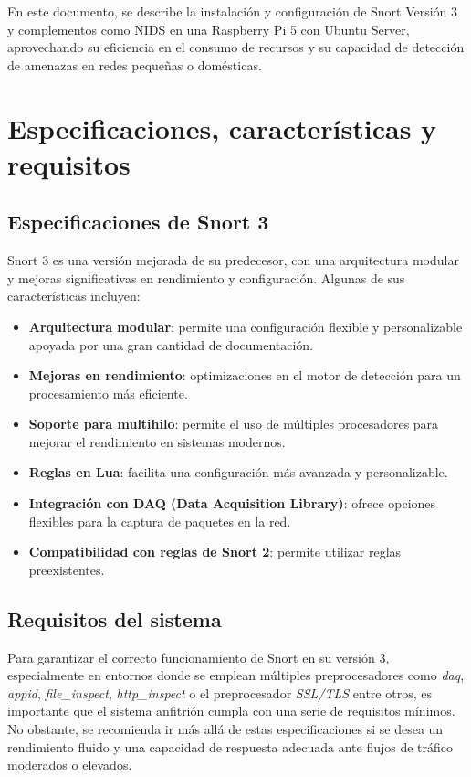 \documentclass[12pt,a4paper]{report}
\begin{document}
En este documento, se describe la instalación y configuración de Snort Versión 3 y complementos como NIDS en una Raspberry Pi 5 con Ubuntu Server, aprovechando su eficiencia en el consumo de recursos y su capacidad de detección de amenazas en redes pequeñas o domésticas.

\section{Especificaciones, características y requisitos}

\subsection{Especificaciones de Snort 3}

Snort 3 es una versión mejorada de su predecesor, con una arquitectura modular y mejoras significativas en rendimiento y configuración. Algunas de sus características incluyen:

\begin{itemize}
\item \textbf{Arquitectura modular}: permite una configuración flexible y personalizable apoyada por una gran cantidad de documentación.
\item \textbf{Mejoras en rendimiento}: optimizaciones en el motor de detección para un procesamiento más eficiente.
\item \textbf{Soporte para multihilo}: permite el uso de múltiples procesadores para mejorar el rendimiento en sistemas modernos.
\item \textbf{Reglas en Lua}: facilita una configuración más avanzada y personalizable.
\item \textbf{Integración con DAQ (Data Acquisition Library)}: ofrece opciones flexibles para la captura de paquetes en la red.
\item \textbf{Compatibilidad con reglas de Snort 2}: permite utilizar reglas preexistentes.
\end{itemize}

\subsection{Requisitos del sistema}

Para garantizar el correcto funcionamiento de Snort en su versión 3, especialmente en entornos donde se emplean múltiples preprocesadores como \textit{daq}, \textit{appid}, \textit{file\_inspect}, \textit{http\_inspect} o el preprocesador \textit{SSL/TLS} entre otros, es importante que el sistema anfitrión cumpla con una serie de requisitos mínimos. No obstante, se recomienda ir más allá de estas especificaciones si se desea un rendimiento fluido y una capacidad de respuesta adecuada ante flujos de tráfico moderados o elevados.\newline
\end{document}
